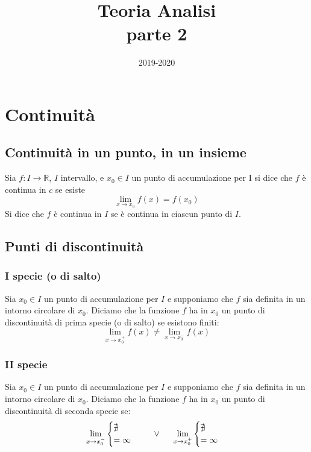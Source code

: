 \documentclass[12pt]{article}
\title{
Teoria Analisi\\
parte 2\\}
\author{}
\date{2019-2020}
\begin{document}
\maketitle

\section{Continuità}

\subsection{Continuità in un punto, in un insieme}

Sia \(f: I \rightarrow \mathbb{R}\), \(I\) intervallo, e
\(x_0 \in I\) un punto di accumulazione per I
si dice che $f$ è continua in $c$ se esiste
\[  \lim_{x \to x_0} f(x) = f(x_0)\]
Si dice che $f$ è continua in $I$ se è continua in ciascun punto di $I$.

\subsection{Punti di discontinuità}

\subsubsection{I specie (o di salto)}
Sia $x_0 \in I$ un punto di accumulazione per $I$
e supponiamo che $f$ sia definita in un intorno
circolare di $x_0$. Diciamo che la funzione $f$ ha
in $x_0$ un punto di discontinuità di prima specie
(o di salto) se esistono finiti:
\[ \lim_{x \to x_{0}^{+}} f(x) \neq \displaystyle \lim_{x \to x_{0}^{-}} f(x) \]

\subsubsection{II specie}
Sia $x_0 \in I$ un punto di accumulazione per $I$
e supponiamo che $f$ sia definita in un intorno
circolare di $x_0$. Diciamo che la funzione $f$ ha
in $x_0$ un punto di discontinuità di seconda specie se:
\[ \lim_{x \to x_{0}^-} \begin{cases} \nexists \\
= \infty \end{cases} \hspace{0.5cm} \vee \hspace{0.5cm} \lim_{x \to x_{0}^+} \begin{cases} \nexists \\
= \infty \end{cases} \]
\end{document}
